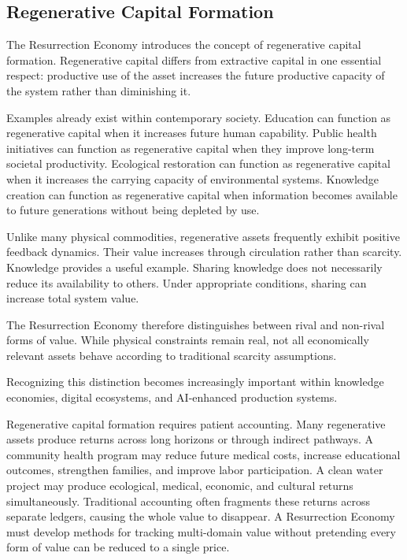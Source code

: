 \documentclass[12pt]{article}
\begin{document}
\subsection{Regenerative Capital Formation}

The Resurrection Economy introduces the concept of regenerative capital formation. Regenerative capital differs from extractive capital in one essential respect: productive use of the asset increases the future productive capacity of the system rather than diminishing it.

Examples already exist within contemporary society. Education can function as regenerative capital when it increases future human capability. Public health initiatives can function as regenerative capital when they improve long-term societal productivity. Ecological restoration can function as regenerative capital when it increases the carrying capacity of environmental systems. Knowledge creation can function as regenerative capital when information becomes available to future generations without being depleted by use.

Unlike many physical commodities, regenerative assets frequently exhibit positive feedback dynamics. Their value increases through circulation rather than scarcity. Knowledge provides a useful example. Sharing knowledge does not necessarily reduce its availability to others. Under appropriate conditions, sharing can increase total system value.

The Resurrection Economy therefore distinguishes between rival and non-rival forms of value. While physical constraints remain real, not all economically relevant assets behave according to traditional scarcity assumptions.

Recognizing this distinction becomes increasingly important within knowledge economies, digital ecosystems, and AI-enhanced production systems.

Regenerative capital formation requires patient accounting. Many regenerative assets produce returns across long horizons or through indirect pathways. A community health program may reduce future medical costs, increase educational outcomes, strengthen families, and improve labor participation. A clean water project may produce ecological, medical, economic, and cultural returns simultaneously. Traditional accounting often fragments these returns across separate ledgers, causing the whole value to disappear. A Resurrection Economy must develop methods for tracking multi-domain value without pretending every form of value can be reduced to a single price.
\end{document}
